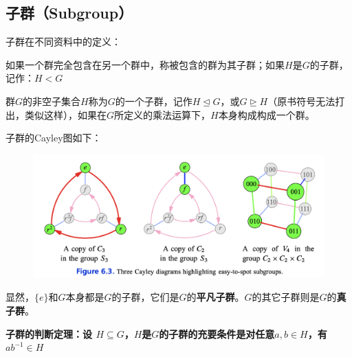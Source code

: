 \documentclass[12pt]{article}
\begin{document}
\subsection{子群（Subgroup）}
\begin{mdframed}[
linecolor=black!40,outerlinewidth=1pt,roundcorner=.5em,innertopmargin=1ex,innerbottommargin=.5\baselineskip,innerrightmargin=1em,innerleftmargin=1em,backgroundcolor=gray!5,
]
子群在不同资料中的定义：

如果一个群完全包含在另一个群中，称被包含的群为其子群；如果$H$是$G$的子群，记作：$H < G${\cite{Visual_Group_Theory}}

群$G$的非空子集合$H$称为$G$的一个子群，记作$H \unlhd G$，或$G \unrhd H$（原书符号无法打出，类似这样），如果在$G$所定义的乘法运算下，$H$本身构成构成一个群。{\cite{From_Linear_Equation_To_Galois_Theory}}
\end{mdframed}

子群的Cayley图如下：
\begin{figure}[H]
    \centering
    \includegraphics[width=.8\textwidth]{fig/Group/Cayley-Subgroup.png}
\end{figure}

显然，$\{e\}$和$G$本身都是$G$的子群，它们是$G$的\textbf{平凡子群}。$G$的其它子群则是$G$的\textbf{真子群}。

\begin{mdframed}[
linecolor=black!40,outerlinewidth=1pt,roundcorner=.5em,innertopmargin=1ex,innerbottommargin=.5\baselineskip,innerrightmargin=1em,innerleftmargin=1em,backgroundcolor=gray!5,
]
\textbf{
子群的判断定理：设 $H \subseteq G$，$H$是$G$的子群的充要条件是对任意$a, b \in H$，有$ab^{-1} \in H$
}
\end{mdframed}
\end{document}
